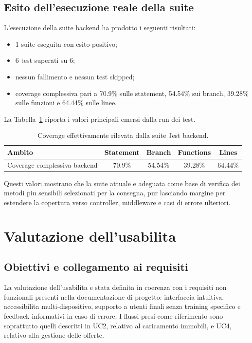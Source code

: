 \documentclass[a4paper,11pt]{article}
\begin{document}
\subsection{Esito dell'esecuzione reale della suite}
L'esecuzione della suite backend ha prodotto i seguenti risultati:
\begin{itemize}
  \item 1 suite eseguita con esito positivo;
  \item 6 test superati su 6;
  \item nessun fallimento e nessun test skipped;
  \item coverage complessiva pari a 70.9\% sulle statement, 54.54\% sui branch, 39.28\% sulle funzioni e 64.44\% sulle linee.
\end{itemize}

La Tabella~\ref{tab:coverage-actual} riporta i valori principali emersi dalla run dei test.

\begin{table}[H]
\centering
\begin{tabular}{@{}lcccc@{}}
\toprule
Ambito & Statement & Branch & Functions & Lines \\
\midrule
Coverage complessiva backend & 70.9\% & 54.54\% & 39.28\% & 64.44\% \\
\bottomrule
\end{tabular}
\caption{Coverage effettivamente rilevata dalla suite Jest backend.}
\label{tab:coverage-actual}
\end{table}

Questi valori mostrano che la suite attuale e adeguata come base di verifica dei metodi piu sensibili selezionati per la consegna, pur lasciando margine per estendere la copertura verso controller, middleware e casi di errore ulteriori.

\section{Valutazione dell'usabilita}

\subsection{Obiettivi e collegamento ai requisiti}
La valutazione dell'usabilita e stata definita in coerenza con i requisiti non funzionali presenti nella documentazione di progetto: interfaccia intuitiva, accessibilita multi-dispositivo, supporto a utenti finali senza training specifico e feedback informativi in caso di errore. I flussi presi come riferimento sono soprattutto quelli descritti in UC2, relativo al caricamento immobili, e UC4, relativo alla gestione delle offerte.
\end{document}

